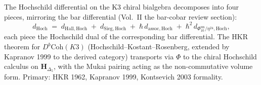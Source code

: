 \begin{remark}
\label{rem:hochcalc-hdelta5-decomp}
The Hochschild differential on the K3 chiral bialgebra decomposes into
four pieces, mirroring the bar differential (Vol.~II
the bar-cobar review section):
\[
d_{\mathrm{Hoch}} \;=\; d_{\mathrm{Hall,Hoch}} \;+\; d_{\mathrm{Sieg,Hoch}} \;+\; \hbar\, d_{\mathrm{assoc,Hoch}} \;+\; \hbar^2\, d_{\Phi_{10}^{\mathrm{un}}/\eta^{24},\mathrm{Hoch}},
\]
each piece the Hochschild dual of the corresponding bar differential.
The HKR theorem for $D^b\mathrm{Coh}(K3)$ (Hochschild--Kostant--Rosenberg,
extended by Kapranov 1999 to the derived category) transports via $\Phi$
to the chiral Hochschild calculus on $\mathbf H_{\Delta_5}$, with the
Mukai pairing acting as the non-commutative volume form. Primary: HKR
1962, Kapranov 1999, Kontsevich 2003 formality.
\end{remark}

